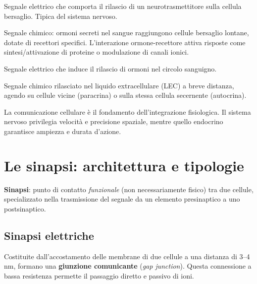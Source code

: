 \documentclass[11pt,a4paper,italian,twoside]{report}
\theoremstyle{definition} %
\begin{document}
\begin{description}[leftmargin=1.5em,style=nextline]
  \item[Nervosa] Segnale elettrico che comporta il rilascio di un neurotrasmettitore sulla cellula bersaglio. Tipica del sistema nervoso.
  \item[Endocrina] Segnale chimico: ormoni secreti nel sangue raggiungono cellule bersaglio lontane, dotate di recettori specifici. L'interazione ormone-recettore attiva risposte come sintesi/attivazione di proteine o modulazione di canali ionici.
  \item[Neuroendocrina] Segnale elettrico che induce il rilascio di ormoni nel circolo sanguigno.
  \item[Paracrina e autocrina] Segnale chimico rilasciato nel liquido extracellulare (LEC) a breve distanza, agendo su cellule vicine (paracrina) o sulla stessa cellula secernente (autocrina).
\end{description}

\begin{concetto}
La comunicazione cellulare è il fondamento dell'integrazione fisiologica. Il sistema nervoso privilegia velocità e precisione spaziale, mentre quello endocrino garantisce ampiezza e durata d'azione.
\end{concetto}

\section{Le sinapsi: architettura e tipologie}
\label{sec:sinapsi}

\begin{definizione}
\textbf{Sinapsi}: punto di contatto \textit{funzionale} (non necessariamente fisico) tra due cellule, specializzato nella trasmissione del segnale da un elemento presinaptico a uno postsinaptico.
\end{definizione}

\subsection{Sinapsi elettriche}
\label{subsec:sinapsi_elettriche}

Costituite dall'accostamento delle membrane di due cellule a una distanza di 3–4 nm, formano una \textbf{giunzione comunicante} (\textit{gap junction}). Questa connessione a bassa resistenza permette il passaggio diretto e passivo di ioni.
\end{document}
